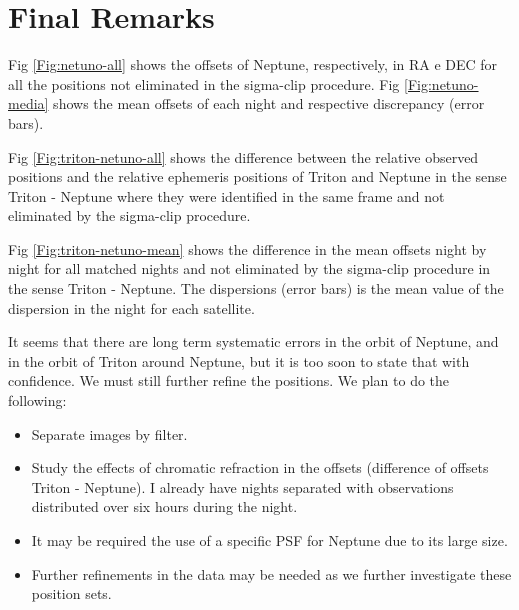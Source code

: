 \documentclass[12pt,a4paper]{report}
\newcommand{\PE}{Perkin-Elmer }
\newcommand{\BC}{Boller \& Chivens }
\begin{document}
\section*{Final Remarks}

Fig \ref{Fig:netuno-all} shows the offsets of Neptune, respectively, in RA e DEC for all the positions not eliminated in the sigma-clip procedure. Fig \ref{Fig:netuno-media} shows the mean offsets of each night and respective discrepancy (error bars).

Fig \ref{Fig:triton-netuno-all} shows the difference between the relative observed positions and the relative ephemeris positions of Triton and Neptune in the sense Triton - Neptune where they were identified in the same frame and not eliminated by the sigma-clip procedure.

Fig \ref{Fig:triton-netuno-mean} shows the difference in the mean offsets night by night for all matched nights and not eliminated by the sigma-clip procedure in the sense Triton - Neptune. The dispersions (error bars) is the mean value of the dispersion in the night for each satellite.



It seems that there are long term systematic errors in the orbit of Neptune, and in the orbit of Triton around Neptune, but it is too soon to state that with confidence. We must still further refine the positions. We plan to do the following:

\begin{itemize}
\item Separate images by filter.
\item Study the effects of chromatic refraction in the offsets (difference of offsets Triton - Neptune). I already have nights separated with observations distributed over six hours during the night.
\item It may be required the use of a specific PSF for Neptune due to its large size.
\item Further refinements in the data may be needed as we further investigate these position sets.
\end{itemize}

\end{document}
